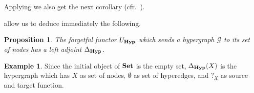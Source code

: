 \documentclass[a4paper,UKenglish,cleveref,pdftex,amsthm,thm-restate,numberwithinsect]{cas-sc}
\theoremstyle{plain}
\newtheorem{proposition}[theorem]{Proposition}
\newtheorem{corollary}[theorem]{Corollary}
\theoremstyle{definition}
\newtheorem{example}[theorem]{Example}
\newcommand{\catname}[1]{\textbf{\textup{#1}}}
\newcommand{\hyp}{\catname{Hyp}}
\begin{document}
Applying  we also get the next corollary (cfr.~\cite[Fact 4.17]{ehrig2006fundamentals}).


 allow us to deduce immediately the following.

\begin{proposition}\label{cor:left}  The forgetful functor $U_{\hyp}$ which sends a hypergraph $\mathcal{G}$ to its set of nodes has a left adjoint $\Delta_{\hyp}$.
\end{proposition}

\begin{example}Since the initial object of $\catname{Set}$ is the empty set,  $\Delta_{\hyp}(X)$ is the hypergraph which has $X$ as set of nodes, $\emptyset$ as set of hyperedges, and $?_X$ as source and target function.
\end{example}

\end{document}
